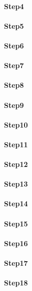 \documentclass[a4paper, 11pt]{scrartcl}
\begin{document}
\paragraph{Step4}
\paragraph{Step5}
\paragraph{Step6}
\paragraph{Step7}
\paragraph{Step8}
\paragraph{Step9}
\paragraph{Step10}
\paragraph{Step11}
\paragraph{Step12}
\paragraph{Step13}
\paragraph{Step14}
\paragraph{Step15}
\paragraph{Step16}
\paragraph{Step17}
\paragraph{Step18}
\end{document}
